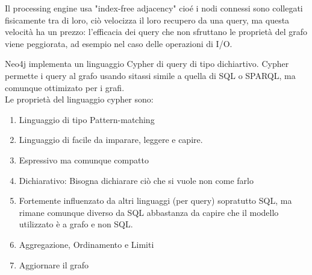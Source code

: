 \documentclass[a4page, 11pt]{article}
\begin{document}
\newline
Il processing engine usa "index-free adjacency" cioé i nodi connessi sono collegati fisicamente tra di loro, ciò velocizza il loro recupero da una query, ma questa velocità ha un prezzo: l'efficacia dei query che non sfruttano le proprietà del grafo viene peggiorata, ad esempio nel caso delle operazioni di I/O.   

Neo4j implementa un linguaggio Cypher di query di tipo dichiartivo. Cypher permette i query al grafo usando sitassi simile a quella di SQL o SPARQL, ma comunque ottimizato per i grafi.\\
Le proprietà del linguaggio cypher sono:

\begin{enumerate}[noitemsep]
	 
	\item
	Linguaggio di tipo Pattern-matching
	\item
	Linguaggio di facile da imparare, leggere e capire.
	\item
	Espressivo ma comunque compatto
	\item
	Dichiarativo: Bisogna dichiarare ciò che si vuole non come farlo
	\item
	Fortemente influenzato da altri linguaggi (per query) sopratutto SQL, ma rimane comunque diverso da SQL abbastanza da capire che il modello utilizzato è a grafo e non SQL.
	\item
	Aggregazione, Ordinamento e Limiti
	\item
	Aggiornare il grafo
\end{enumerate}
\end{document}
